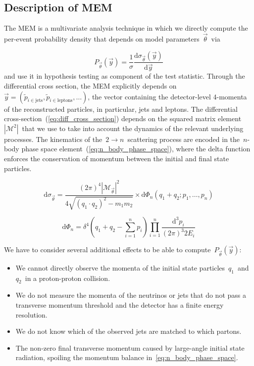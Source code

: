 \subsection{Description of MEM}

The MEM is a multivariate analysis technique in which we directly compute the per-event probability density that depends on model parameters~$\vec{\theta}$~via

\begin{equation}
P_{\vec{\theta}}(\vec{y}) = \frac{1}{\sigma}
\frac{\mathrm{d}\sigma_{\vec{\theta}}(\vec{y})}{\mathrm{d}\vec{y}}
\end{equation}
and use it in hypothesis testing as component of the test statistic. Through the differential cross section, the MEM explicitly depends on~$\vec{y} = (\tilde{p}_{i \in \mathrm{jets}}, \tilde{p}_{i \in \mathrm{leptons}}, \dots)$, the vector containing the detector-level 4-momenta of the reconstructed particles, in particular, jets and leptons. The differential cross-section~(\cref{eq:diff_cross_section}) depends on the squared matrix element~$|\mathcal{M}^2|$~that we use to take into account the dynamics of the relevant underlying processes. The kinematics of the~$2 \rightarrow n$~scattering process are encoded in the~$n$-body phase space element~(\cref{eq:n_body_phase_space}), where the delta function enforces the conservation of momentum between the initial and final state particles.

\begin{equation}
\label{eq:diff_cross_section}
\mathrm{d}\sigma_{\vec{\theta}} = \frac{(2\pi)^4 |\mathcal{M}_{\vec{\theta}}|^2}{4 \sqrt{(q_1 \cdot q_2)^2 - m_1 m_2}} \times
\mathrm{d}\Phi_n(q_1 + q_2; p_1, \dots, p_{n})
\end{equation}

\begin{equation}
\label{eq:n_body_phase_space}
\mathrm{d}\Phi_n = \delta^4 (q_1 + q_2 - \sum_{i=1}^n p_i) \prod_{i=1}^n \frac{\mathrm{d}^3 p_i}{(2\pi)^3 2 E_i}
\end{equation}

We have to consider several additional effects to be able to compute~$P_{\vec{\theta}}(\vec{y})$:
\begin{itemize}
\item We cannot directly observe the momenta of the initial state particles~$q_1$~and~$q_2$~in a proton-proton collision.
\item We do not measure the momenta of the neutrinos or jets that do not pass a transverse momentum threshold and the detector has a finite energy resolution.
\item We do not know which of the observed jets are matched to which partons.
\item The non-zero final transverse momentum caused by large-angle initial state radiation, spoiling the momentum balance in~\cref{eq:n_body_phase_space}.
\end{itemize}

